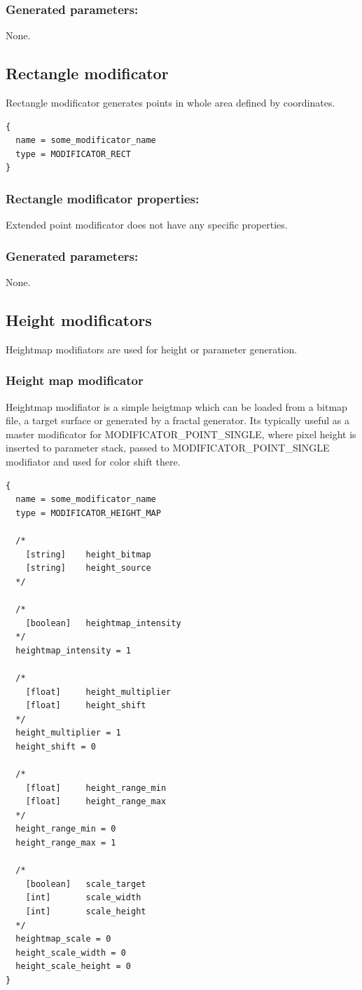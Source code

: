 \documentclass[9pt]{article}
\begin{document}
\subsubsection*{Generated parameters:}

None.

\subsection{Rectangle modificator}

Rectangle modificator generates points in whole area defined by coordinates.
\begin{verbatim}
{
  name = some_modificator_name
  type = MODIFICATOR_RECT
}
\end{verbatim}
\subsubsection*{Rectangle modificator properties:}
Extended point modificator does not have any specific properties.
\subsubsection*{Generated parameters:}

None.

\subsection{Height modificators}

Heightmap modifiators are used for height or parameter generation.

\subsubsection{Height map modificator}

Heightmap modifiator is a simple heigtmap which can be loaded from a bitmap
file, a target surface or generated by a fractal generator. Its typically useful
as a master modificator for MODIFICATOR\_POINT\_SINGLE, where pixel height
is inserted to parameter stack, passed to MODIFICATOR\_POINT\_SINGLE modifiator
and used for color shift there.

\begin{verbatim}
{
  name = some_modificator_name
  type = MODIFICATOR_HEIGHT_MAP
  
  /*    
    [string]    height_bitmap
    [string]    height_source
  */
  
  /*
    [boolean]   heightmap_intensity
  */
  heightmap_intensity = 1
  
  /*    
    [float]     height_multiplier
    [float]     height_shift
  */
  height_multiplier = 1
  height_shift = 0
  
  /*
    [float]     height_range_min
    [float]     height_range_max
  */  
  height_range_min = 0
  height_range_max = 1
  
  /*  
    [boolean]   scale_target
    [int]       scale_width
    [int]       scale_height
  */
  heightmap_scale = 0
  height_scale_width = 0
  height_scale_height = 0
}
\end{verbatim}
\end{document}
